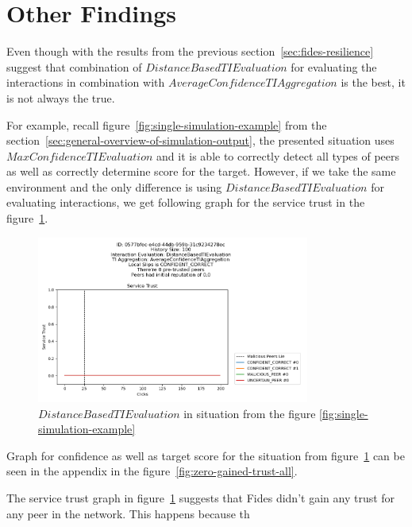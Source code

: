 \section{Other Findings}
\label{sec:other-findings}

Even though with the results from the previous section~\ref{sec:fides-resilience} suggest that combination of $DistanceBasedTIEvaluation$ for evaluating the interactions in combination with $AverageConfidenceTIAggregation$ is the best, it is not always the true.

For example, recall figure~\ref{fig:single-simulation-example} from the section~\ref{sec:general-overview-of-simulation-output}, the presented situation uses $MaxConfidenceTIEvaluation$ and it is able to correctly detect all types of peers as well as correctly determine score for the target.
However, if we take the same environment and the only difference is using $DistanceBasedTIEvaluation$ for evaluating interactions, we get following graph for the service trust in the figure~\ref{fig:zero-gained-trust}.

\begin{figure}[!h]
    \centering
    \includegraphics[width=0.8\textwidth]{assets/zero_gained_trust.png}
    \caption{$DistanceBasedTIEvaluation$ in situation from the figure \ref{fig:single-simulation-example}}
    \label{fig:zero-gained-trust}
\end{figure}

\noindent
Graph for confidence as well as target score for the situation from figure~\ref{fig:zero-gained-trust} can be seen in the appendix in the figure~\ref{fig:zero-gained-trust-all}.

The service trust graph in figure~\ref{fig:zero-gained-trust} suggests that Fides didn't gain any trust for any peer in the network.
This happens because th
